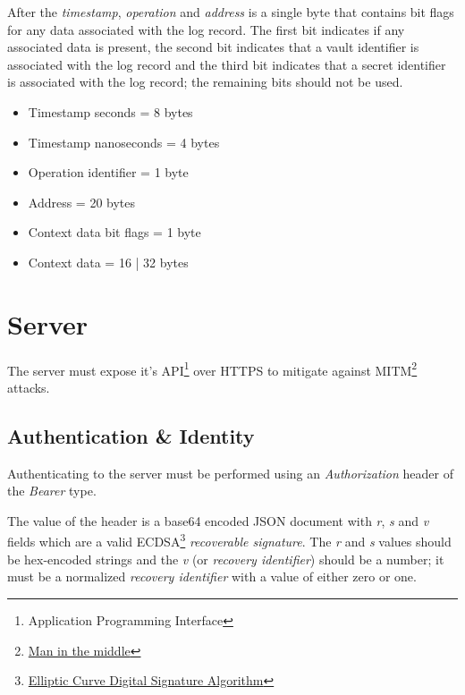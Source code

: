 \documentclass[a4paper,titlepage,oneside]{article}
\renewcommand{\paragraph}{\small}
\begin{document}
\paragraph{After the \emph{timestamp}, \emph{operation} and \emph{address} is a single byte that contains bit flags for any data associated with the log record. The first bit indicates if any associated data is present, the second bit indicates that a vault identifier is associated with the log record and the third bit indicates that a secret identifier is associated with the log record; the remaining bits should not be used.}

\begin{itemize}
  \item Timestamp seconds = 8 bytes
  \item Timestamp nanoseconds = 4 bytes
  \item Operation identifier = 1 byte
  \item Address = 20 bytes
  \item Context data bit flags = 1 byte
  \item Context data = 16 | 32 bytes
\end{itemize}

\section{Server}

\paragraph{The server must expose it's API\footnote{Application Programming Interface} over HTTPS to mitigate against MITM\footnote{\href{https://en.wikipedia.org/wiki/Man-in-the-middle_attack}{Man in the middle}} attacks.}

\subsection{Authentication \& Identity}

\paragraph{Authenticating to the server must be performed using an \emph{Authorization} header of the \emph{Bearer} type.}

\paragraph{The value of the header is a base64 encoded JSON document with \emph{r}, \emph{s} and \emph{v} fields which are a valid ECDSA\footnote{\href{https://en.wikipedia.org/wiki/Elliptic_Curve_Digital_Signature_Algorithm}{Elliptic Curve Digital Signature Algorithm}} \emph{recoverable signature}. The \emph{r} and \emph{s} values should be hex-encoded strings and the \emph{v} (or \emph{recovery identifier}) should be a number; it must be a normalized \emph{recovery identifier} with a value of either zero or one.}
\end{document}

